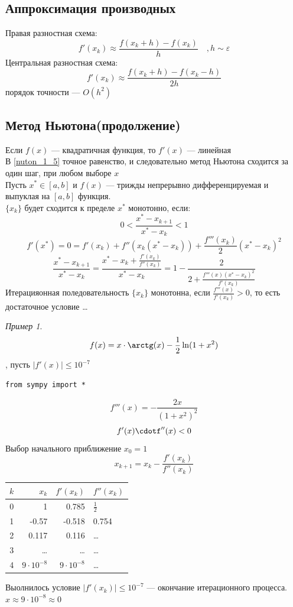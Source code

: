 \documentclass[oneside]{book}
\theoremstyle{plain}
\theoremstyle{remark}
\newtheorem*{examp}{Пример}
\theoremstyle{definition}
\begin{document}
\subsection{Аппроксимация производных}
\label{sec:org6b0920a}
Правая разностная схема:
\[ f'(x_k) \approx \frac{f(x_k + h) - f(x_k)}{h}\quad ,h \sim \varepsilon \]
Центральная разностная схема:
\[ f'(x_k) \approx \frac{f(x_k + h) - f(x_k - h)}{2h} \]
порядок точности --- \(O(h^2)\)
\subsection{Метод Ньютона(продолжение)}
\label{sec:org5856168}
Если \(f(x)\) --- квадратичная функция, то \(f'(x)\) --- линейная \\
В \ref{nuton_1_5} точное равенство, и следовательно метод Ньютона
сходится за один шаг, при любом выборе \(x\) \\
Пусть \(x^* \in [a, b]\) и \(f(x)\) --- трижды непрерывно дифференцируемая и выпуклая на \([a, b]\) функция. \\
\(\{x_k\}\) будет сходится к пределе \(x^*\) монотонно, если:
\[ 0<\frac{x^* - x_{k+1}}{x^* - x_k} < 1 \]
\[ f'(x^*) = 0 = f'(x_k) + f''(x_k(x^* - x_k)) + \frac{f'''(x_k)}{2}(x^* - x_k)^2 \]
\[ \frac{x^* - x_{k + 1}}{x^* - x_k} = \frac{x^* - x_k + \frac{f'(x_k)}{f''(x_k)}}{x^* - x_k} = 1 - \frac{2}{2 + \frac{f'''(x)(x^* - x_k)^2}{f'(x_k)}}\]
Итерацияонная поледовательность \(\{x_k\}\) монотонна, если \(\frac{f'''(x)}{f'(x_k)} > 0\),
то есть достаточное условие \color{red}\dots{}\color{black}

\begin{examp}
\[ f(x) = x\cdot\arctg(x) - \frac{1}{2}\ln(1 + x^2) \]
, пусть \(|f'(x)| \le 10^{-7}\)
\begin{verbatim}
from sympy import *
\end{verbatim}

\[ f'''(x) = -\frac{2x}{(1 + x^2)^2} \]
\[ f'(x)\cdotf''(x) < 0 \]
Выбор начального приближение \(x_0 = 1\)
\[ x_{k + 1} = x_k - \frac{f'(x_k)}{f''(x_k)} \]
\begin{center}
\begin{tabular}{r|rrl|}
\(k\) & \(x_k\) & \(f'(x_k)\) & \(f''(x_k)\)\\
\hline
0 & 1 & 0.785 & \(\frac{1}{2}\)\\
1 & -0.57 & -0.518 & 0.754\\
2 & 0.117 & 0.116 & \dots{}\\
3 & \dots{} & \dots{} & \dots{}\\
4 & \(9\cdot 10^{-8}\) & \(9\cdot10^{-8}\) & \dots{}\\
\end{tabular}
\end{center}
Выолнилось условие \(|f'(x_k)| \le 10^{-7}\) --- окончание итерационного процесса. \(x \approx 9\cdot 10^{-8} \approx 0\)
\end{examp}
\end{document}
